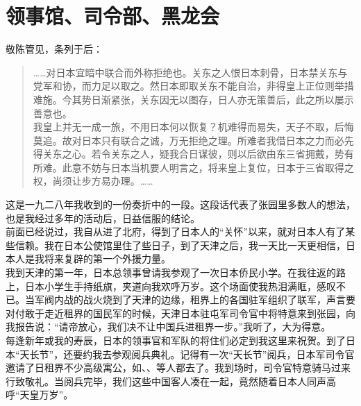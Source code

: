 \fancyhead[RO]{} %
\fancyhead[LE]{} %
\chapter*{领事馆、司令部、黑龙会}
\thispagestyle{empty}
敬陈管见，条列于后：\\

\begin{quote}
	……对日本宜暗中联合而外称拒绝也。关东之人恨日本刺骨，日本禁关东与党军和协，而力足以取之。然日本即取关东不能自治，非得皇上正位则举措难施。今其势日渐紧张，关东因无以图存，日人亦无策善后，此之所以屡示善意也。\\

我皇上并无一成一旅，不用日本何以恢复？机难得而易失，天子不取，后悔莫追。故对日本只有联合之诚，万无拒绝之理。所难者我借日本之力而必先得关东之心。若令关东之人，疑我合日谋彼，则以后欲由东三省拥戴，势有所难。此意不妨与日本当机要人明言之，将来皇上复位，日本于三省取得之权，尚须让步方易办理。……\\
\end{quote}

这是一九二八年我收到的一份奏折中的一段。这段话代表了张园里多数人的想法，也是我经过多年的活动后，日益信服的结论。\\

前面已经说过，我自从进了北府，得到了日本人的“关怀”以来，就对日本人有了某些信赖。我在日本公使馆里住了些日子，到了天津之后，我一天比一天更相信，日本人是我将来复辟的第一个外援力量。\\

我到天津的第一年，日本总领事曾请我参观了一次日本侨民小学。在我往返的路上，日本小学生手持纸旗，夹道向我欢呼万岁。这个场面使我热泪满眶，感叹不已。当军阀内战的战火烧到了天津的边缘，租界上的各国驻军组织了联军，声言要对付敢于走近租界的国民军的时候，天津日本驻屯军司令官中将特意来到张园，向我报告说：“请帝放心，我们决不让中国兵进租界一步。”我听了，大为得意。\\

每逢新年或我的寿辰，日本的领事官和军队的将住们必定到我这里来祝贺。到了日本“天长节”，还要约我去参观阅兵典礼。记得有一次“天长节”阅兵，日本军司令官邀请了日租界不少高级寓公，如、、等人都去了。我到场时，司令官特意骑马过来行致敬礼。当阅兵完毕，我们这些中国客人凑在一起，竟然随着日本人同声高呼“天皇万岁”。\\

